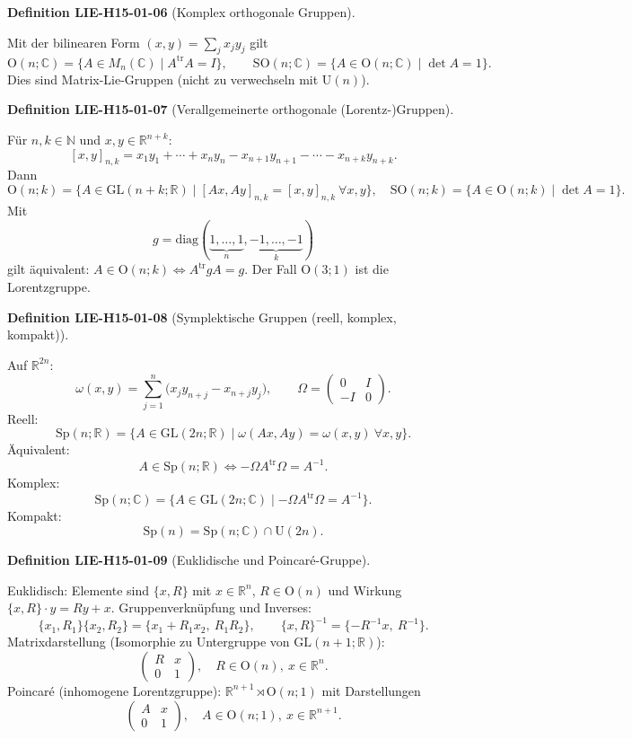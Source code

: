 \documentclass[10pt, letterpaper]{article}
\newcommand{\R}{\mathbb{R}}
\newcommand{\N}{\mathbb{N}}
\newcommand{\C}{\mathbb{C}}
\newcommand{\GL}{\mathrm{GL}}
\newcommand{\SO}{\mathrm{SO}}
\newcommand{\Sp}{\mathrm{Sp}}
\newcommand{\Ogroup}{\mathrm{O}} %
\newcommand{\U}{\mathrm{U}}
\newcommand{\CustomHeading}[3]{%
  \par\medskip\noindent%
  \textbf{#1 #2} \textnormal{(#3)}.\enskip%
}
\newenvironment{DEF}[2]{\begin{unitbox}\CustomHeading{Definition}{#1}{#2}}{\end{unitbox}}
\begin{document}
\begin{DEF}{LIE-H15-01-06}{Komplex orthogonale Gruppen}
Mit der bilinearen Form $(x,y)=\sum_j x_jy_j$ gilt
\[
\Ogroup(n;\C)=\{A\in M_n(\C)\mid A^{\mathrm{tr}}A=I\},\qquad
\SO(n;\C)=\{A\in \Ogroup (n;\C)\mid \det A=1\}.
\]
Dies sind Matrix-Lie-Gruppen (nicht zu verwechseln mit $\U(n)$).
\end{DEF}


\begin{DEF}{LIE-H15-01-07}{Verallgemeinerte orthogonale (Lorentz-)Gruppen}
Für $n,k\in\N$ und $x,y\in\R^{n+k}$:
\[
[x,y]_{n,k}=x_1y_1+\cdots+x_ny_n - x_{n+1}y_{n+1}-\cdots - x_{n+k}y_{n+k}.
\]
Dann
\[
\Ogroup(n;k)=\{A\in \GL(n{+}k;\R)\mid [Ax,Ay]_{n,k}=[x,y]_{n,k}\ \forall x,y\},\quad
\SO(n;k)=\{A\in \Ogroup (n;k)\mid \det A=1\}.
\]
Mit
\[
g=\mathrm{diag}(\underbrace{1,\dots,1}_{n},\underbrace{-1,\dots,-1}_{k})
\]
gilt äquivalent: $A\in\Ogroup(n;k)\iff A^{\mathrm{tr}}gA=g$. Der Fall $\Ogroup(3;1)$ ist die Lorentzgruppe.
\end{DEF}


\begin{DEF}{LIE-H15-01-08}{Symplektische Gruppen (reell, komplex, kompakt)}
Auf $\R^{2n}$:
\[
\omega(x,y)=\sum_{j=1}^n\big(x_j y_{n+j} - x_{n+j} y_j\big),\qquad
\Omega=\begin{pmatrix}0&I\\ -I&0\end{pmatrix}.
\]
Reell:
\[
\Sp(n;\R)=\{A\in \GL(2n;\R)\mid \omega(Ax,Ay)=\omega(x,y)\ \forall x,y\}.
\]
Äquivalent:
\[
A\in\Sp(n;\R)\iff -\Omega A^{\mathrm{tr}}\Omega = A^{-1}.
\]
Komplex:
\[
\Sp(n;\C)=\{A\in \GL(2n;\C)\mid -\Omega A^{\mathrm{tr}}\Omega = A^{-1}\}.
\]
Kompakt:
\[
\Sp(n)=\Sp(n;\C)\cap \U(2n).
\]
\end{DEF}


\begin{DEF}{LIE-H15-01-09}{Euklidische und Poincaré-Gruppe}
Euklidisch: Elemente sind $\{x,R\}$ mit $x\in\R^n$, $R\in\Ogroup(n)$ und Wirkung $\{x,R\}\cdot y=Ry+x$.
Gruppenverknüpfung und Inverses:
\[
\{x_1,R_1\}\{x_2,R_2\}=\{x_1+R_1x_2,\ R_1R_2\},\qquad
\{x,R\}^{-1}=\{-R^{-1}x,\ R^{-1}\}.
\]
Matrixdarstellung (Isomorphie zu Untergruppe von $\GL(n{+}1;\R)$):
\[
\begin{pmatrix}
R & x\\
0 & 1
\end{pmatrix},\quad R\in\Ogroup (n),\ x\in\R^n.
\]
Poincaré (inhomogene Lorentzgruppe): $\R^{n+1}\rtimes \Ogroup (n;1)$ mit Darstellungen
\[
\begin{pmatrix}
A & x\\
0 & 1
\end{pmatrix},\quad A\in\Ogroup (n;1),\ x\in\R^{n+1}.
\]
\end{DEF}
\end{document}
